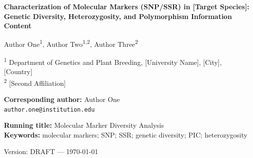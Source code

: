 \documentclass[12pt, a4paper]{article}
\begin{document}
\begin{titlepage}
    \centering
    \vspace*{2cm}

    {\LARGE\bfseries
        Characterization of Molecular Markers (SNP/SSR) in
        [Target Species]: Genetic Diversity, Heterozygosity, and
        Polymorphism Information Content
    \par}

    \vspace{1.5cm}

    {\large
        Author One\textsuperscript{1},
        Author Two\textsuperscript{1,2},
        Author Three\textsuperscript{2}
    \par}

    \vspace{1cm}

    {\normalsize
        \textsuperscript{1} Department of Genetics and Plant Breeding,
        [University Name], [City], [Country] \\[4pt]
        \textsuperscript{2} [Second Affiliation]
    \par}

    \vspace{1cm}

    {\normalsize
        \textbf{Corresponding author:} Author One \\
        \texttt{author.one@institution.edu}
    \par}

    \vspace{1.5cm}

    {\normalsize
        \textbf{Running title:} Molecular Marker Diversity Analysis \\[4pt]
        \textbf{Keywords:} molecular markers; SNP; SSR; genetic diversity;
        PIC; heterozygosity
    \par}

    \vfill
    {\small Version: DRAFT — \today}
\end{titlepage}
\end{document}
